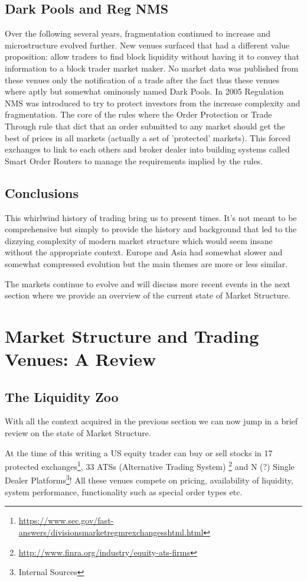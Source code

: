 \subsection{Dark Pools and Reg NMS}
Over the following several years, fragmentation continued to increase and microstructure evolved further. New venues surfaced that had a different value proposition:  allow traders to find block liquidity without having it to convey that information to a block trader market maker. No market data was  published from these venues only the notification of a trade after the fact thus these venues where aptly but somewhat ominously named Dark Pools. In 2005 Regulation NMS was introduced to try to protect investors from the increase complexity and fragmentation. The core of the rules where the Order Protection or Trade Through rule that dict that an order submitted to any market should get the best of prices in all markets (actually a set of 'protected' markets). This forced exchanges to link to each others and broker dealer into building systems called Smart Order Routers to manage the requirements implied by the rules.

\subsection{Conclusions}
This whirlwind history of trading bring us to present times. It's not meant to be comprehensive but simply to provide the history and background that led to the dizzying complexity of modern market structure which would seem insane without the appropriate context. Europe and Asia had somewhat slower and somewhat compressed evolution but the main themes are more or less similar.

The markets continue to evolve and will discuss more recent events in the next section where we provide an overview of the current state of Market Structure.

\section{Market Structure and Trading Venues: A Review}

\subsection{The Liquidity Zoo}
With all the context acquired in the previous section we can now jump in a brief review on the state of Market Structure. 

At the time of this writing a US equity trader can buy or sell stocks  in 17 protected exchanges\footnote{\url{https://www.sec.gov/fast-answers/divisionsmarketregmrexchangesshtml.html}}, 33 ATSs (Alternative Trading System) \footnote{\url{http://www.finra.org/industry/equity-ats-firms}} and N (?) Single Dealer Platforms\footnote{Internal Sources}!  All these venues compete on pricing, availability of liquidity, system performance, functionality such as special order types etc. 

